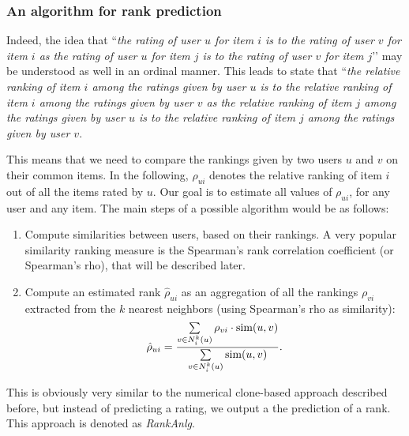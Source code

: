 \subsubsection{An algorithm for rank prediction}
Indeed, the idea that ``\textit{the rating of user $u$ for item $i$ is to the
rating of user $v$ for item $i$ as the rating of user $u$ for item $j$ is to
the rating of user $v$ for item $j$}’’ may be understood  as well in an ordinal
manner. This leads to state that ``\textit{the relative ranking of item $i$
  among the ratings given by user $u$  is to the relative ranking of item $i$
  among the ratings given by user $v$ as the relative ranking of item $j$ among
  the ratings given by user $u$  is to the relative ranking of item $j$ among
the ratings given by user $v$}.

This means that we need to compare the rankings given by two users $u$ and $v$
on their common items. In the following, $\rho_{ui}$ denotes the relative
ranking of item $i$ out of all the items rated by $u$. Our goal is to estimate
all values of $\rho_{ui}$, for any user and any item. The main steps of a
possible algorithm would be as follows:
\begin{enumerate}
  \item Compute similarities between users, based on their rankings. A very
    popular similarity ranking measure is the Spearman's rank correlation
    coefficient (or Spearman's rho), that will be described later.
  \item Compute an estimated rank $\hat{\rho}_{ui}$ as an aggregation of all the
    rankings $\rho_{vi}$ extracted from the $k$ nearest neighbors (using
    Spearman's rho as similarity):
    $$\hat{\rho}_{ui} = \frac{\sum\limits_{v \in N_i^k(u)} \rho_{vi} \cdot
    \text{sim}(u, v)}{\sum\limits_{v \in N_i^k(u)} \text{sim}(u, v)}.$$
\end{enumerate}

This is obviously very similar to the numerical clone-based approach described
before, but instead of predicting a rating, we output a the prediction of a rank. This
approach is denoted as \textit{RankAnlg}.

